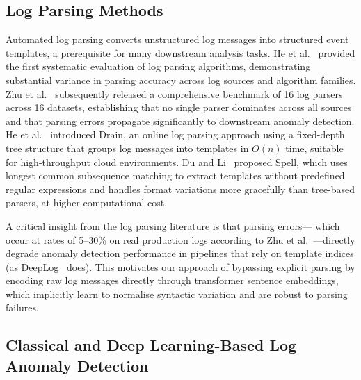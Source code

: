 \documentclass[conference]{IEEEtran}
\begin{document}
\subsection{Log Parsing Methods}

Automated log parsing converts unstructured log messages into structured
event templates, a prerequisite for many downstream analysis tasks.
He et al.~\cite{he2016} provided the first systematic evaluation of log
parsing algorithms, demonstrating substantial variance in parsing accuracy
across log sources and algorithm families.  Zhu et al.~\cite{zhu2019}
subsequently released a comprehensive benchmark of 16 log parsers across
16 datasets, establishing that no single parser dominates across all sources
and that parsing errors propagate significantly to downstream anomaly
detection.  He et al.~\cite{he2017} introduced Drain, an online log parsing
approach using a fixed-depth tree structure that groups log messages into
templates in $O(n)$ time, suitable for high-throughput cloud environments.
Du and Li~\cite{du2016} proposed Spell, which uses longest common subsequence
matching to extract templates without predefined regular expressions and
handles format variations more gracefully than tree-based parsers, at higher
computational cost.

A critical insight from the log parsing literature is that parsing errors---
which occur at rates of 5--30\% on real production logs according to Zhu
et al.~\cite{zhu2019}---directly degrade anomaly detection performance in
pipelines that rely on template indices (as DeepLog~\cite{du2017} does).
This motivates our approach of bypassing explicit parsing by encoding raw log
messages directly through transformer sentence embeddings, which implicitly
learn to normalise syntactic variation and are robust to parsing failures.

\subsection{Classical and Deep Learning-Based Log Anomaly Detection}
\end{document}
